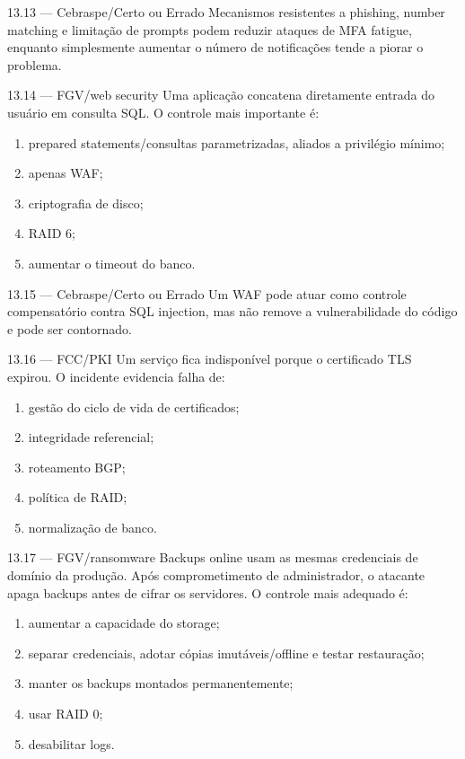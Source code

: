 \begin{questao}{ 13.13 — Cebraspe/Certo ou Errado}
Mecanismos resistentes a phishing, number matching e limitação de prompts podem reduzir ataques de MFA fatigue, enquanto simplesmente aumentar o número de notificações tende a piorar o problema.
\end{questao}

\begin{questao}{ 13.14 — FGV/web security}
Uma aplicação concatena diretamente entrada do usuário em consulta SQL. O controle mais importante é:
\begin{enumerate}[label=\Alph*)]
\item prepared statements/consultas parametrizadas, aliados a privilégio mínimo;
\item apenas WAF;
\item criptografia de disco;
\item RAID 6;
\item aumentar o timeout do banco.
\end{enumerate}
\end{questao}

\begin{questao}{ 13.15 — Cebraspe/Certo ou Errado}
Um WAF pode atuar como controle compensatório contra SQL injection, mas não remove a vulnerabilidade do código e pode ser contornado.
\end{questao}

\begin{questao}{ 13.16 — FCC/PKI}
Um serviço fica indisponível porque o certificado TLS expirou. O incidente evidencia falha de:
\begin{enumerate}[label=\Alph*)]
\item gestão do ciclo de vida de certificados;
\item integridade referencial;
\item roteamento BGP;
\item política de RAID;
\item normalização de banco.
\end{enumerate}
\end{questao}

\begin{questao}{ 13.17 — FGV/ransomware}
Backups online usam as mesmas credenciais de domínio da produção. Após comprometimento de administrador, o atacante apaga backups antes de cifrar os servidores. O controle mais adequado é:
\begin{enumerate}[label=\Alph*)]
\item aumentar a capacidade do storage;
\item separar credenciais, adotar cópias imutáveis/offline e testar restauração;
\item manter os backups montados permanentemente;
\item usar RAID 0;
\item desabilitar logs.
\end{enumerate}
\end{questao}


